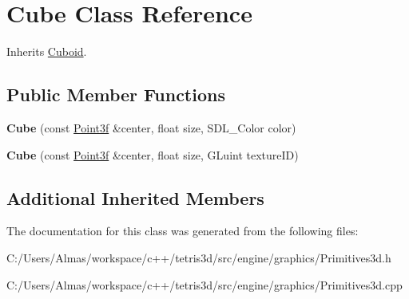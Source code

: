 \hypertarget{class_cube}{\section{Cube Class Reference}
\label{class_cube}
}


Inherits \hyperlink{class_cuboid}{Cuboid}.

\subsection*{Public Member Functions}
\begin{DoxyCompactItemize}
\item 
\hypertarget{class_cube_a8fbd2bc9ad8946b2df735b7ab84a80bb}{{\bfseries Cube} (const \hyperlink{struct_point3f}{Point3f} \&center, float size, S\-D\-L\-\_\-\-Color color)}\label{class_cube_a8fbd2bc9ad8946b2df735b7ab84a80bb}

\item 
\hypertarget{class_cube_a74076ae678258d31b9d2eee14d60ba04}{{\bfseries Cube} (const \hyperlink{struct_point3f}{Point3f} \&center, float size, G\-Luint texture\-I\-D)}\label{class_cube_a74076ae678258d31b9d2eee14d60ba04}

\end{DoxyCompactItemize}
\subsection*{Additional Inherited Members}


The documentation for this class was generated from the following files\-:\begin{DoxyCompactItemize}
\item 
C\-:/\-Users/\-Almas/workspace/c++/tetris3d/src/engine/graphics/Primitives3d.\-h\item 
C\-:/\-Users/\-Almas/workspace/c++/tetris3d/src/engine/graphics/Primitives3d.\-cpp\end{DoxyCompactItemize}
